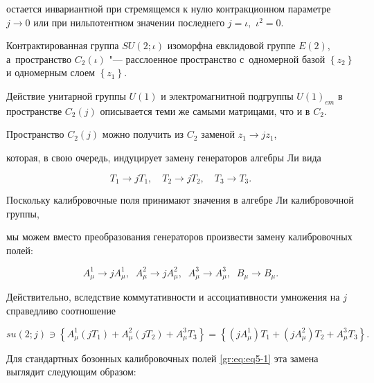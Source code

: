 остается инвариантной при стремящемся к нулю контракционном параметре $j \rightarrow 0$ или при нильпотентном значении последнего  $j= \iota,$  $\iota^2=0$.







Контрактированная группа $SU(2;\iota)$ изоморфна евклидовой группе $E(2)$, а~пространство $C_2(\iota)$ "--- расслоенное пространство с~одномерной базой $\left\{z_2\right\}$ и одномерным слоем $\left\{z_1\right\}$. 

Действие унитарной группы $U(1)$ и электромагнитной подгруппы  $U(1)_{em}$ в пространстве $C_2(j)$ описывается теми же самыми матрицами, что и в $C_2$.



Пространство $C_2(j)$ можно получить из $C_2$  заменой $z_1 \rightarrow jz_1$, 

которая, в свою очередь, индуцирует замену генераторов алгебры Ли вида

$$T_1 \rightarrow jT_1,\quad  T_2 \rightarrow jT_2,\quad T_3 \rightarrow T_3. $$

Поскольку калибровочные поля принимают значения в алгебре Ли калибровочной группы, 

мы можем вместо преобразования генераторов произвести замену калибровочных полей:

\begin{equation}

A_{\mu}^1 \rightarrow jA_{\mu}^1, \;\; A_{\mu}^2 \rightarrow jA_{\mu}^2,\; \;A_{\mu}^3 \rightarrow A_{\mu}^3, \;\;

B_{\mu} \rightarrow B_{\mu}.

\label{gr:eq:g14}

\end{equation}

Действительно, вследствие  коммутативности и ассоциативности умножения на $j$ справедливо соотношение

\begin{equation}

su(2;j)\ni \left\{   A_{\mu}^1(j T_1) + A_{\mu}^2(j T_2) + A_{\mu}^3T_3\right\}=

 \left\{ (j A_{\mu}^1)T_1 + (j A_{\mu}^2)T_2 +

A_{\mu}^3T_3\right\}.

\label{gr:eq:g14-d}

\end{equation}

Для стандартных бозонных калибровочных полей \eqref{gr:eq:eq5-1} эта замена выглядит следующим образом:

